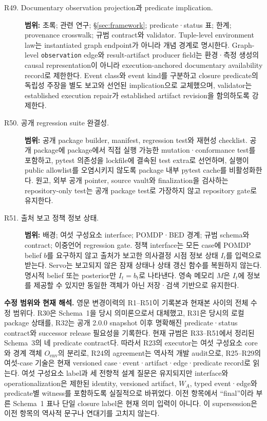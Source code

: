\documentclass[11pt]{article}
\begin{document}
\begin{description}
  \item[R49. Documentary observation projection과 predicate implication.]
  \textbf{범위:} 초록; 관련 연구; \S\ref{sec:framework}; predicate·status 표; 한계; provenance crosswalk; 규범 contract와 validator.
  Tuple-level environment law는 instantiated graph endpoint가 아니라 개념 경계로 명시한다. Graph-level \texttt{observation} edge와 result-artifact producer field는 환경·측정 생성의 causal representation이 아니라 execution-anchored documentary availability record로 제한한다. Event class와 event kind를 구분하고 closure predicate의 독립성 주장을 별도 보고와 선언된 implication으로 교체했으며, validator는 established execution repair가 established artifact revision을 함의하도록 강제한다.
  \item[R50. 공개 regression suite 완결성.]
  \textbf{범위:} 공개 package builder, manifest, regression test와 재현성 checklist.
  공개 package에 package에서 직접 실행 가능한 mutation·conformance test를 포함하고, pytest 의존성을 lockfile에 결속된 test extra로 선언하며, 실행이 public allowlist를 오염시키지 않도록 package 내부 pytest cache를 비활성화한다. 원고, 외부 공개 pointer, source vault와 finalization을 검사하는 repository-only test는 공개 package test로 가장하지 않고 repository gate로 유지한다.
  \item[R51. 출처 보고 정책 정보 상태.]
  \textbf{범위:} 배경; 여섯 구성요소 interface; POMDP·BED 경계; 규범 schema와 contract; 이중언어 regression gate.
  정책 interface는 모든 case에 POMDP belief $b$를 요구하지 않고 출처가 보고한 의사결정 시점 정보 상태 $I_t$를 입력으로 받는다. Servo는 보고되지 않은 잠재 상태나 상태 갱신 함수를 복원하지 않는다. 명시적 belief 또는 posterior만 $I_t=b_t$로 나타낸다. 영속 메모리 $M$은 $I_t$에 정보를 제공할 수 있지만 동일한 객체가 아닌 저장·검색 기반으로 유지한다.
\end{description}

\noindent\textbf{수정 범위와 현재 해석.} 영문 변경이력의 R1--R51이 기록본과 현재본 사이의 전체 수정 범위다. R30은 Schema~1을 당시 의미론으로서 대체했고, R31은 당시의 로컬 package 상태를, R32는 공개 2.0.0 snapshot 이후 명확해진 predicate·status contract와 successor release 필요성을 기록한다. 현재 규범은 R33--R51에서 정리된 Schema~3의 네 predicate contract다. 따라서 R23의 executor는 여섯 구성요소 core와 경계 객체 $O_{\mathrm{env}}$의 분리로, R24의 agreement는 역사적 개발 audit으로, R25--R29의 여섯-case 기술은 현재 versioned case·event·artifact·edge·predicate record로 읽는다. 여섯 구성요소 label과 세 전향적 설계 질문은 유지되지만 interface와 operationalization은 제한된 identity, versioned artifact, $W_A$, typed event·edge와 predicate별 witness를 포함하도록 실질적으로 바뀌었다. 이전 항목에서 ``final''이라 부른 Schema~1 표나 단일 closure label은 현재 의미 입력이 아니다. 이 supersession은 이전 항목의 역사적 문구나 연대기를 고치지 않는다.
\end{document}
